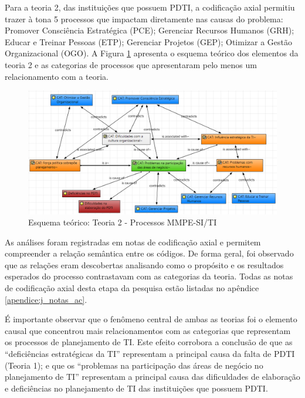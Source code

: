 Para a teoria 2, das instituições que possuem PDTI, a codificação axial permitiu trazer à tona 5 processos que impactam diretamente nas causas do problema: Promover Consciência Estratégica (PCE); Gerenciar Recursos Humanos (GRH); Educar e Treinar Pessoas (ETP); Gerenciar Projetos (GEP); Otimizar a Gestão Organizacional (OGO). A Figura \ref{figura:teoria_processos_grupo2} apresenta o esquema teórico dos elementos da teoria 2 e as categorias de processos que apresentaram pelo menos um relacionamento com a teoria.

\begin{figure}[h!]
\centering %
\includegraphics[width=15cm]{figuras/teoria_processos_grupo2.PNG}
\caption{Esquema teórico: Teoria 2 - Processos MMPE-SI/TI}
\label{figura:teoria_processos_grupo2}
\end{figure}

As análises foram registradas em notas de codificação axial e permitem compreender a relação semântica entre os códigos. De forma geral, foi observado que as relações eram descobertas analisando como o propósito e os resultados esperados do processo contrastavam com as categorias da teoria. Todas as notas de codificação axial desta etapa da pesquisa estão listadas no apêndice \autoref{apendice:j_notas_ac}.

É importante observar que o fenômeno central de ambas as teorias foi o elemento causal que concentrou mais relacionamentos com as categorias que representam os processos de planejamento de TI. Este efeito corrobora a conclusão de que as ``deficiências estratégicas da TI'' representam a principal causa da falta de PDTI (Teoria 1); e que os ``problemas na participação das áreas de negócio no planejamento de TI'' representam a principal causa das dificuldades de elaboração e deficiências no planejamento de TI das instituições que possuem PDTI.


